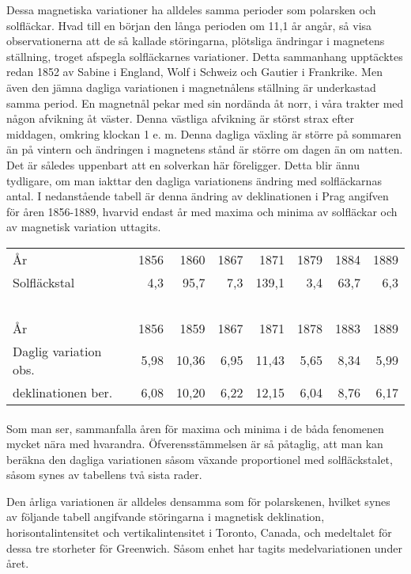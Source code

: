 \documentclass[a4paper, 12pt, oneside, swedish]{article}
\begin{document}
Dessa magnetiska variationer ha alldeles samma perioder som polarsken och solfläckar. Hvad till en början den långa perioden om 11,1 år angår, så visa observationerna att de så kallade störingarna, plötsliga ändringar i magnetens ställning, troget afspegla solfläckarnes variationer. Detta sammanhang upptäcktes redan 1852 av Sabine i England, Wolf i Schweiz och Gautier i Frankrike. Men även den jämna dagliga variationen i magnetnålens ställning är underkastad samma period. En magnetnål pekar med sin nordända åt norr, i våra trakter med någon afvikning åt väster. Denna västliga afvikning är störst strax efter middagen, omkring klockan 1 e. m. Denna dagliga växling är större på sommaren än på vintern och ändringen i magnetens stånd är större om dagen än om natten. Det är således uppenbart att en solverkan här föreligger. Detta blir ännu tydligare, om man iakttar den dagliga variationens ändring med solfläckarnas antal. I nedanstående tabell är denna ändring av deklinationen i Prag angifven för åren 1856-1889, hvarvid endast år med maxima och minima av solfläckar och av magnetisk variation uttagits.

\begin{table}[H]
    \centering
    \footnotesize
    \begin{tabular}{l r r r r r r r}
        År & 1856 & 1860 & 1867 & 1871 & 1879 & 1884 & 1889 \\
        Solfläckstal & 4,3 & 95,7 & 7,3 & 139,1 & 3,4 & 63,7 & 6,3   \\ \hline
        ~ & ~ & ~ & ~ & ~ & ~ & ~ & ~ \\
        År & 1856 & 1859 & 1867 & 1871 & 1878 & 1883 & 1889 \\
        Daglig variation obs. & 5,98 & 10,36 & 6,95 & 11,43 & 5,65 & 8,34 & 5,99   \\
        deklinationen ber. & 6,08 & 10,20 & 6,22 & 12,15 & 6,04 & 8,76 & 6,17 \\
    \end{tabular}
\end{table}
\paragraph{}
Som man ser, sammanfalla åren för maxima och minima i de båda fenomenen mycket nära med hvarandra. Öfverensstämmelsen är så påtaglig, att man kan beräkna den dagliga variationen såsom växande proportionel med solfläckstalet, såsom synes av tabellens två sista rader.

Den årliga variationen är alldeles densamma som för polarskenen, hvilket synes av följande tabell angifvande störingarna i magnetisk deklination, horisontalintensitet och vertikalintensitet i Toronto, Canada, och medeltalet för dessa tre storheter för Greenwich. Såsom enhet har tagits medelvariationen under året.
\end{document}
